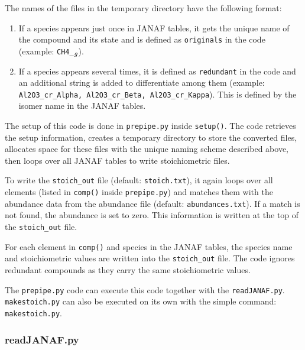 The names of the files in the temporary directory have the following
format: {
\begin{enumerate}
\setlength\itemsep{0ex}
\setlength\topsep{0ex}
\setlength\partopsep{0ex}
\setlength\parsep{0ex}

   \item If a species appears just once in JANAF tables, it gets the
   unique name of the compound and its state and is defined
   as \texttt{originals} in the code
   (example: \texttt{CH4\_$\sb{g}$}).  \item If a species appears
   several times, it is defined as \texttt{redundant} in the code and
   an additional string is added to differentiate among them
   (example: \texttt{Al2O3\_{cr}\_{Alpha}, \newline
   Al2O3\_{cr}\_{Beta}, Al2O3\_{cr}\_{Kappa}}). This is defined by the
   isomer name in the JANAF tables.
\end{enumerate}


The setup of this code is done in \texttt{prepipe.py}
inside \texttt{setup()}. The code retrieves the setup information,
creates a temporary directory to store the converted files, allocates
space for these files with the unique naming scheme described above,
then loops over all JANAF tables to write stoichiometric files.

To write the \texttt{stoich\_{out}} file
(default: \texttt{stoich.txt}), it again loops over all elements
(listed in \texttt{comp()} inside \texttt{prepipe.py}) and matches
them with the abundance data from the abundance file (default:
\texttt{abundances.txt}). If a match is not found, the abundance is set to
zero. This information is written at the top of
the \texttt{stoich\_{out}} file.

For each element in \texttt{comp()} and species in the JANAF tables,
the species name and stoichiometric values are written into
the \texttt{stoich\_{out}} file. The code ignores redundant compounds
as they carry the same stoichiometric values.

The \texttt{prepipe.py} code can execute this code together with
the \texttt{readJANAF.py}. \newline
\texttt{makestoich.py} can also be executed on its own with the simple
 command: \texttt{makestoich.py}. 

}

\subsubsection{readJANAF.py}

